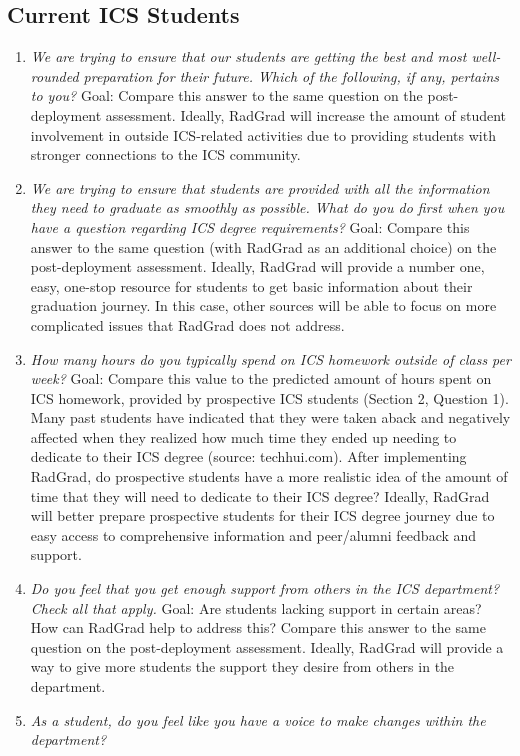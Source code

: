 \subsection{Current ICS Students}
\begin{enumerate}
\item \textit{We are trying to ensure that our students are getting the best and most well-rounded preparation for their future. Which of the following, if any, pertains to you? }
Goal: Compare this answer to the same question on the post-deployment assessment. Ideally, RadGrad will increase the amount of student involvement in outside ICS-related activities due to providing students with stronger connections to the ICS community.
\item \textit{We are trying to ensure that students are provided with all the information they need to graduate as smoothly as possible. What do you do first when you have a question regarding ICS degree requirements?}
Goal: Compare this answer to the same question (with RadGrad as an additional choice) on the post-deployment assessment. Ideally, RadGrad will provide a number one, easy, one-stop resource for students to get basic information about their graduation journey. In this case, other sources will be able to focus on more complicated issues that RadGrad does not address.
\item \textit{How many hours do you typically spend on ICS homework outside of class per week?}
Goal: Compare this value to the predicted amount of hours spent on ICS homework, provided by prospective ICS students (Section 2, Question 1). Many past students have indicated that they were taken aback and negatively affected when they realized how much time they ended up needing to dedicate to their ICS degree (source: techhui.com). After implementing RadGrad, do prospective students have a more realistic idea of the amount of time that they will need to dedicate to their ICS degree? Ideally, RadGrad will better prepare prospective students for their ICS degree journey due to easy access to comprehensive information and peer/alumni feedback and support.
\item \textit{Do you feel that you get enough support from others in the ICS department? Check all that apply.}
Goal: Are students lacking support in certain areas? How can RadGrad help to address this? Compare this answer to the same question on the post-deployment assessment. Ideally, RadGrad will provide a way to give more students the support they desire from others in the department. 
\item \textit{As a student, do you feel like you have a voice to make changes within the department?}

\end{enumerate}
